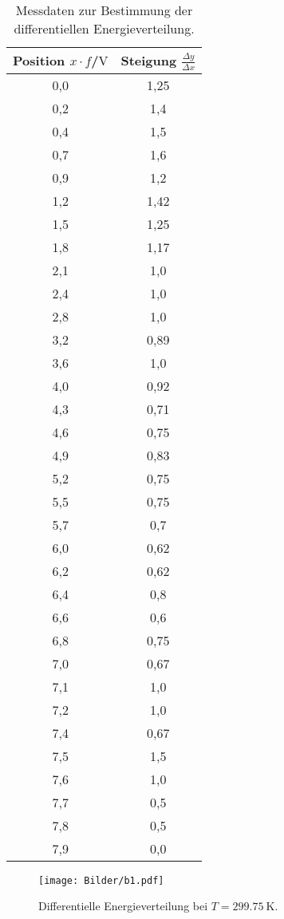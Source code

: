 \begin{table}
	\centering
	\caption{Messdaten zur Bestimmung der differentiellen Energieverteilung.}
	\label{tab:tab2}
	\begin{tabular}{cc}
		\toprule
		Position $x \cdot f$/$\si{\volt}$&Steigung $\frac{\Delta y}{\Delta x}$\\
		\midrule
		0,0 & 1,25 \\
		0,2 & 1,4 \\
		0,4 & 1,5 \\
		0,7 & 1,6 \\
		0,9 & 1,2 \\
		1,2 & 1,42 \\
		1,5 & 1,25 \\
		1,8 & 1,17 \\
		2,1 & 1,0 \\
		2,4 & 1,0 \\
		2,8 & 1,0 \\
		3,2 & 0,89 \\
		3,6 & 1,0 \\
		4,0 & 0,92 \\
		4,3 & 0,71 \\
		4,6 & 0,75 \\
		4,9 & 0,83 \\
		5,2 & 0,75 \\
		5,5 & 0,75 \\
		5,7 & 0,7 \\
		6,0 & 0,62 \\
		6,2 & 0,62 \\
		6,4 & 0,8 \\
		6,6 & 0,6 \\
		6,8 & 0,75 \\
		7,0 & 0,67 \\
		7,1 & 1,0 \\
		7,2 & 1,0 \\
		7,4 & 0,67 \\
		7,5 & 1,5 \\
		7,6 & 1,0 \\
		7,7 & 0,5 \\
		7,8 & 0,5 \\
		7,9 & 0,0 \\
		\bottomrule
	\end{tabular}
\end{table}
\begin{figure}
	\centering
	\texttt{[image: Bilder/b1.pdf]}
	\caption{Differentielle Energieverteilung bei $T=\SI{299.75}{\kelvin}$.}
	\label{fig:plot}
\end{figure}

